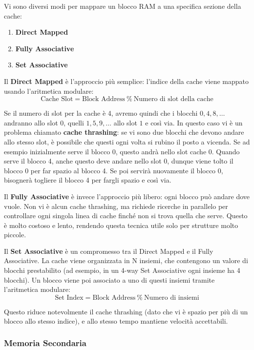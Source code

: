 \documentclass[11pt, a4paper, titlepage, oneside]{scrbook}
\begin{document}
Vi sono diversi modi per mappare un blocco RAM a una specifica sezione della cache:
\begin{enumerate}
    \item \textbf{Direct Mapped}
    \item \textbf{Fully Associative}
    \item \textbf{Set Associative}
\end{enumerate}

Il \textbf{Direct Mapped} è l'approccio più semplice: l'indice della cache viene mappato usando l'aritmetica modulare:
\[
\text{Cache Slot} = \text{Block Address} \ \% \ \text{Numero di slot della cache}
\]

Se il numero di slot per la cache è 4, avremo quindi che i blocchi $0,4,8, \ldots$ andranno allo slot $0$, quelli $1,5,9,\ldots$ allo slot $1$ e così via. In questo caso vi è un problema chiamato \textbf{cache thrashing}: se vi sono due blocchi che devono andare allo stesso slot, è possibile che questi ogni volta si rubino il posto a vicenda. Se ad esempio inizialmente serve il blocco 0, questo andrà nello slot cache 0. Quando serve il blocco 4, anche questo deve andare nello slot 0, dunque viene tolto il blocco 0 per far spazio al blocco 4. Se poi servirà nuovamente il blocco 0, bisognerà togliere il blocco 4 per fargli spazio e così via.

Il \textbf{Fully Associative} è invece l'approccio più libero: ogni blocco può andare dove vuole. Non vi è alcun cache thrashing, ma richiede ricerche in parallelo per controllare ogni singola linea di cache finché non si trova quella che serve. Questo è molto costoso e lento, rendendo questa tecnica utile solo per strutture molto piccole.

Il \textbf{Set Associative} è un compromesso tra il Direct Mapped e il Fully Associative. La cache viene organizzata in N insiemi, che contengono un valore di blocchi prestabilito (ad esempio, in un 4-way Set Associative ogni insieme ha 4 blocchi). Un blocco viene poi associato a uno di questi insiemi tramite l'aritmetica modulare:
\[
\text{Set Index} = \text{Block Address} \ \% \ \text{Numero di insiemi}
\]

Questo riduce notevolmente il cache thrashing (dato che vi è spazio per più di un blocco allo stesso indice), e allo stesso tempo mantiene velocità accettabili.

\subsubsection*{Memoria Secondaria}
\end{document}
